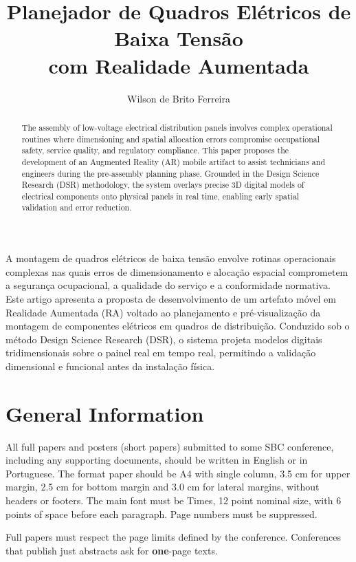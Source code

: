 \documentclass[12pt]{article}
\title{Planejador de Quadros Elétricos de Baixa Tensão\\ com Realidade Aumentada}
\author{Wilson de Brito Ferreira\inst{1}}
\begin{document}
 

\maketitle

\begin{abstract}
  The assembly of low-voltage electrical distribution panels involves complex operational 
  routines where dimensioning and spatial allocation errors compromise occupational safety,
   service quality, and regulatory compliance. This paper proposes the development of an 
   Augmented Reality (AR) mobile artifact to assist technicians and engineers during the 
   pre-assembly planning phase. Grounded in the Design Science Research (DSR) methodology,
    the system overlays precise 3D digital models of electrical components onto physical 
    panels in real time, enabling early spatial validation and error reduction.
\end{abstract}
     
\begin{resumo} 
  A montagem de quadros elétricos de baixa tensão envolve rotinas operacionais complexas 
  nas quais erros de dimensionamento e alocação espacial comprometem a segurança 
  ocupacional, a qualidade do serviço e a conformidade normativa. Este artigo apresenta 
  a proposta de desenvolvimento de um artefato móvel em Realidade Aumentada (RA) voltado ao 
  planejamento e pré-visualização da montagem de componentes elétricos em quadros 
  de distribuição. Conduzido sob o método Design Science Research (DSR), o sistema 
  projeta modelos digitais tridimensionais sobre o painel real em tempo real, permitindo a 
  validação dimensional e funcional antes da instalação física.
\end{resumo}


\section{General Information}

All full papers and posters (short papers) submitted to some SBC conference,
including any supporting documents, should be written in English or in
Portuguese. The format paper should be A4 with single column, 3.5 cm for upper
margin, 2.5 cm for bottom margin and 3.0 cm for lateral margins, without
headers or footers. The main font must be Times, 12 point nominal size, with 6
points of space before each paragraph. Page numbers must be suppressed.

Full papers must respect the page limits defined by the conference.
Conferences that publish just abstracts ask for \textbf{one}-page texts.
\end{document}
